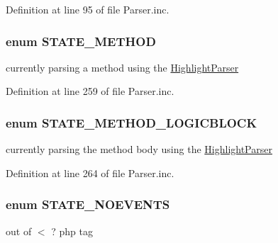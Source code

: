 \-Definition at line 95 of file \-Parser.\-inc.

\hypertarget{_parser_8inc_ab09a2f652eec586f191d7f7b5427bdf8}{
\subsubsection[{\-S\-T\-A\-T\-E\-\_\-\-M\-E\-T\-H\-O\-D}]{\setlength{\rightskip}{0pt plus 5cm}enum {\bf \-S\-T\-A\-T\-E\-\_\-\-M\-E\-T\-H\-O\-D}}}\label{_parser_8inc_ab09a2f652eec586f191d7f7b5427bdf8}
currently parsing a method using the \hyperlink{}{\-Highlight\-Parser} 

\-Definition at line 259 of file \-Parser.\-inc.

\hypertarget{_parser_8inc_a019f56bcda3a3a22838fd4602280a230}{
\subsubsection[{\-S\-T\-A\-T\-E\-\_\-\-M\-E\-T\-H\-O\-D\-\_\-\-L\-O\-G\-I\-C\-B\-L\-O\-C\-K}]{\setlength{\rightskip}{0pt plus 5cm}enum {\bf \-S\-T\-A\-T\-E\-\_\-\-M\-E\-T\-H\-O\-D\-\_\-\-L\-O\-G\-I\-C\-B\-L\-O\-C\-K}}}\label{_parser_8inc_a019f56bcda3a3a22838fd4602280a230}
currently parsing the method body using the \hyperlink{}{\-Highlight\-Parser} 

\-Definition at line 264 of file \-Parser.\-inc.

\hypertarget{_parser_8inc_a20faaaef87097b7911d85bbb7b13a00d}{
\subsubsection[{\-S\-T\-A\-T\-E\-\_\-\-N\-O\-E\-V\-E\-N\-T\-S}]{\setlength{\rightskip}{0pt plus 5cm}enum {\bf \-S\-T\-A\-T\-E\-\_\-\-N\-O\-E\-V\-E\-N\-T\-S}}}\label{_parser_8inc_a20faaaef87097b7911d85bbb7b13a00d}
out of $<$ ? php tag 

